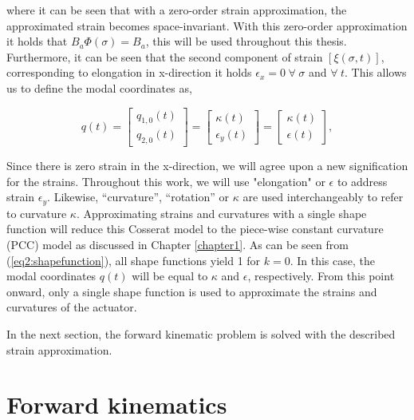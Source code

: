 where it can be seen that with a zero-order strain approximation, the approximated strain becomes space-invariant. With this zero-order approximation it holds that $B_a \Phi(\sigma) = B_a$, this will be used throughout this thesis. Furthermore, it can be seen that the second component of strain $[\xi(\sigma,t)]$, corresponding to elongation in x-direction it holds $\epsilon_x = 0 \hspace{3pt} \forall \hspace{3pt} \sigma $ and $ \forall \hspace{3pt} t$. This allows us to define the modal coordinates as,


\begin{equation}
q(t) = \begin{bmatrix} q_{1,0}(t) \\ q_{2,0}(t) \end{bmatrix} = \begin{bmatrix} \kappa(t) \\ \epsilon_y(t) \end{bmatrix} = \begin{bmatrix} \kappa(t) \\ \epsilon(t) \end{bmatrix},
\end{equation}

 Since there is zero strain in the x-direction, we will agree upon a new signification for the strains. Throughout this work, we will use "elongation" or $\epsilon$ to address strain $\epsilon_y$. Likewise, ``curvature'', ``rotation'' or  $\kappa$ are used interchangeably to refer to curvature $\kappa$. Approximating strains and curvatures with a single shape function will reduce this Cosserat model to the piece-wise constant curvature (PCC) model as discussed in Chapter \ref{chapter1}. As can be seen from (\ref{eq2:shapefunction}), all shape functions yield 1 for $k=0$. In this case, the modal coordinates $q(t)$ will be equal to $\kappa$ and $\epsilon$, respectively. From this point onward, only a single shape function is used to approximate the strains and curvatures of the actuator. 

In the next section, the forward kinematic problem is solved with the described strain approximation.




\section{Forward kinematics}

